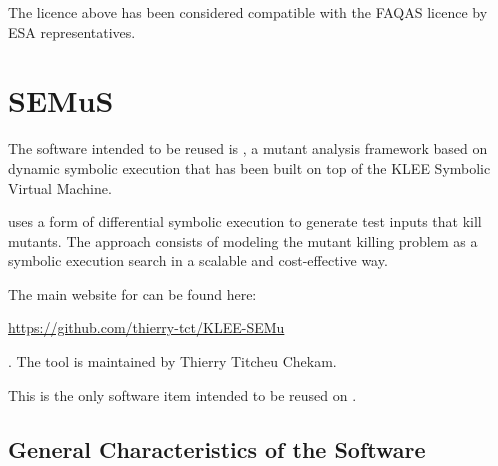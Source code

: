 The licence above has been considered compatible with the FAQAS licence by ESA representatives.

\section{SEMuS}
\label{sec:semus:reuse}

The software intended to be reused is \SEMU, a mutant analysis framework based on dynamic symbolic execution that has been built on top of the KLEE Symbolic Virtual Machine.

\SEMU uses a form of differential symbolic execution to generate test inputs that kill mutants. The approach consists of modeling the mutant killing problem as a symbolic execution search in a scalable and cost-effective way.

The main website for \SEMU can be found here: \begin{scriptsize}\url{https://github.com/thierry-tct/KLEE-SEMu}\end{scriptsize}. The tool is maintained by Thierry Titcheu Chekam.

This is the only software item intended to be reused on \SEMUS.

\subsection{General Characteristics of the Software}

